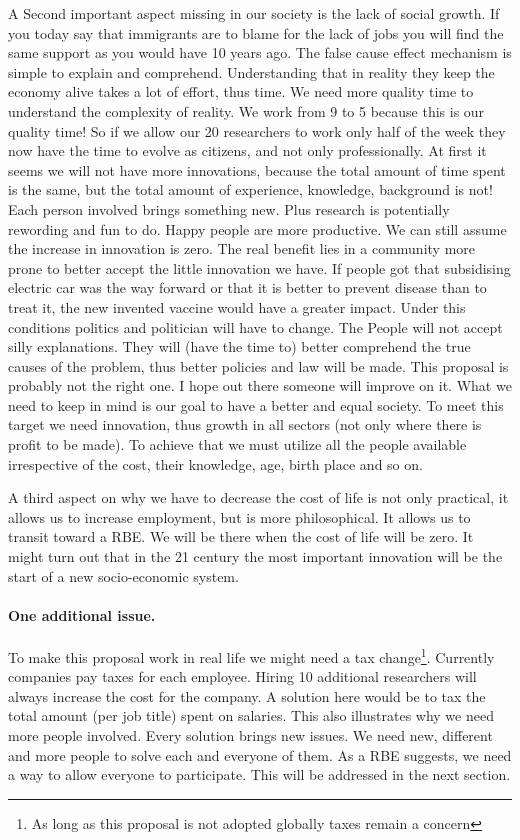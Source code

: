\documentclass{article}
\begin{document}
A Second important aspect missing in our society is the lack of social growth.
If you today say that immigrants are to blame for the lack of jobs you will find the same support as you would have 10 years ago.
The false cause effect mechanism is simple to explain and comprehend.
Understanding that in reality they keep the economy alive takes a lot of effort, thus time.
We need more quality time to understand the complexity of reality.
We work from 9 to 5 because this is our quality time!
So if we allow our 20 researchers to work only half of the week they now have the time to evolve as citizens, and not only professionally.
At first it seems we will not have more innovations, because the total amount of time spent is the same, but the total amount of experience, knowledge, background is not!
Each person involved brings something new.
Plus research is potentially rewording and fun to do.
Happy people are more productive.
We can still assume the increase in innovation is zero.
The real benefit lies in a community more prone to better accept the little innovation we have.
If people got that subsidising electric car was the way forward or that it is better to prevent disease than to treat it, the new invented vaccine would have a greater impact.
Under this conditions politics and politician will have to change.
The People will not accept silly explanations.
They will (have the time to) better comprehend the true causes of the problem, thus better policies and law will be made.
This proposal is probably not the right one.
I hope out there someone will improve on it.
What we need to keep in mind is our goal to have a better and equal society.
To meet this target we need innovation, thus growth in all sectors (not only where there is profit to be made).
To achieve that we must utilize all the people available irrespective of the cost, their knowledge, age, birth place and so on.

A third aspect on why we have to decrease the cost of life is not only practical, it allows us to increase employment, but is more philosophical.
It allows us to transit toward a RBE.
We will be there when the cost of life will be zero.
It might turn out that in the 21 century the most important innovation will be the start of a new socio-economic system.

\paragraph{One additional issue.}
To make this proposal work in real life we might need a tax change\footnote{As long as this proposal is not adopted globally taxes remain a concern}.
Currently companies pay taxes for each employee.
Hiring 10 additional researchers will always increase the cost for the company.
A solution here would be to tax the total amount (per job title) spent on salaries.
This also illustrates why we need more people involved.
Every solution brings new issues.
We need new, different and more people to solve each and everyone of them.
As a RBE suggests, we need a way to allow everyone to participate.
This will be addressed in the next section.
\newpage


\end{document}
